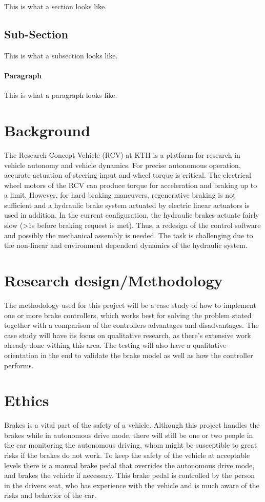 \documentclass[a4paper,11pt]{kth-mag}
\begin{document}
This is what a section looks like.

\subsection{Sub-Section}
This is what a subsection looks like.

\paragraph{Paragraph} This is what a paragraph looks like.

\section{Background}
The Research Concept Vehicle (RCV) at KTH is a platform for research in vehicle autonomy and vehicle dynamics. For precise autonomous operation, accurate actuation of steering input and wheel torque is critical. The electrical wheel motors of the RCV can produce torque for acceleration and braking up to a limit. However, for hard braking maneuvers, regenerative braking is not sufficient and a hydraulic brake system actuated by electric linear actuators is used in addition. In the current configuration, the hydraulic brakes actuate fairly slow (>1s before braking request is met). Thus, a redesign of the control software and possibly the mechanical assembly is needed. The task is challenging due to the non-linear and environment dependent dynamics of the hydraulic system.


\section{Research design/Methodology}
The methodology used for this project will be a case study of how to implement one or more brake controllers, which works best for solving the problem stated together with a comparison of the controllers advantages and disadvantages. The case study will have its focus on qualitative research, as there's extensive work already done withing this area. The testing will also have a qualitative orientation in the end to validate the brake model as well as how the controller performs. 

\section{Ethics}
Brakes is a vital part of the safety of a vehicle. Although this project handles the brakes while in autonomous drive mode, there will still be one or two people in the car monitoring the autonomous driving, whom might be susceptible to great risks if the brakes do not work. To keep the safety of the vehicle at acceptable levels there is a manual brake pedal that overrides the autonomous drive mode, and brakes the vehicle if necessary. This brake pedal is controlled by the person in the drivers seat, who has experience with the vehicle and is much aware of the risks and behavior of the car. 
\end{document}
